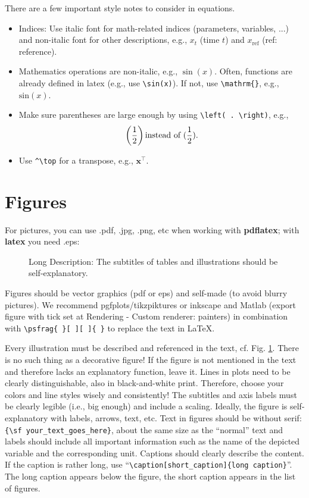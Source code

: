 There are a few important style notes to consider in equations.
\begin{itemize}
\item Indices: Use italic font for math-related indices (parameters, variables, ...) and non-italic font for other descriptions, e.g., $x_t$ (time $t$) and $x_{\text{ref}}$ (ref: reference).
\item Mathematics operations are non-italic, e.g., $\sin(x)$. Often, functions are already defined in latex (e.g., use \verb|\sin(x)|). If not, use \verb|\mathrm{}|, e.g., $\mathrm{sin}(x)$.
\item Make sure parentheses are large enough by using \verb|\left( . \right)|, e.g., \[\left( \frac{1}{2} \right) \textnormal{instead of } ( \frac{1}{2} ) .\]
\item Use \verb|^\top| for a transpose, e.g., $\boldsymbol{x}^\top$.
\end{itemize}



\section{Figures}

For pictures, you can use .pdf, .jpg, .png, etc when working with \textbf{pdflatex}; with \textbf{latex} you need .eps:
\begin{figure}[htb]
\centering
\caption[Abbreviated Description]{Long Description: The subtitles of tables and illustrations should be self-explanatory.}
\label{fig:abb1}
\end{figure}

Figures should be vector graphics (pdf or eps) and self-made (to avoid blurry pictures). We recommend pgfplots/tikzpiktures or inkscape and Matlab (export figure with tick set at Rendering - Custom renderer: painters) in combination with \verb|\psfrag{ }[ ][ ]{ }| to replace the text in \LaTeX.

Every illustration must be described and referenced in the text, cf. Fig. \ref{fig:abb1}. 
There is no such thing as a decorative figure! 
If the figure is not mentioned in the text and therefore lacks an explanatory function, leave it.
Lines in plots need to be clearly distinguishable, also in black-and-white print. Therefore, choose your colors and line styles wisely and consistently!
The subtitles and axis labels must be clearly legible (i.e., big enough) and include a scaling. Ideally, the figure is self-explanatory with labels, arrows, text, etc. Text in figures should be without serif: \verb|{\sf your_text_goes_here}|, about the same size as the ``normal'' text and labels should include all important information such as the name of the depicted variable and the corresponding unit. Captions should clearly describe the content. If the caption is rather long, use ``\verb|\caption[short_caption]{long caption}|''. The long caption appears below the figure, the short caption appears in the list of figures. 

